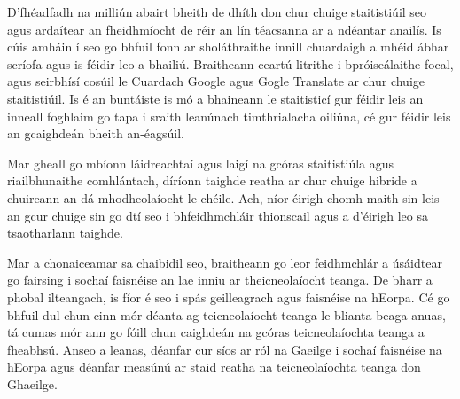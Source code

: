 \documentclass[]{../../metanetpaper}
\begin{document}
\begin{multicols}{2}
D’fhéadfadh na milliún abairt bheith de dhíth don chur chuige staitistiúil seo agus ardaítear an fheidhmíocht de réir an lín téacsanna ar a ndéantar anailís. Is cúis amháin í seo go bhfuil fonn ar sholáthraithe innill chuardaigh a mhéid ábhar scríofa agus is féidir leo a bhailiú. Braitheann ceartú litrithe i bpróiseálaithe focal, agus seirbhísí cosúil le Cuardach Google agus Gogle Translate ar chur chuige staitistiúil. Is é an buntáiste is mó a bhaineann le staitisticí gur féidir leis an inneall foghlaim go tapa i sraith leanúnach timthrialacha oiliúna, cé gur féidir leis an gcaighdeán bheith an-éagsúil. 

Mar gheall go mbíonn láidreachtaí agus laigí na gcóras staitistiúla agus riailbhunaithe comhlántach, díríonn taighde reatha ar chur chuige hibride a chuireann an dá mhodheolaíocht le chéile. Ach, níor éirigh chomh maith sin leis an gcur chuige sin go dtí seo i bhfeidhmchláir thionscail agus a d’éirigh leo sa tsaotharlann taighde. 

Mar a chonaiceamar sa chaibidil seo, braitheann go leor feidhmchlár a úsáidtear go fairsing i sochaí faisnéise an lae inniu ar theicneolaíocht teanga. De bharr a phobal ilteangach, is fíor é seo i spás geilleagrach agus faisnéise na hEorpa. Cé go bhfuil dul chun cinn mór déanta ag teicneolaíocht teanga le blianta beaga anuas, tá cumas mór ann go fóill chun caighdeán na gcóras teicneolaíochta teanga a fheabhsú. Anseo a leanas, déanfar cur síos ar ról na Gaeilge i sochaí faisnéise na hEorpa agus déanfar measúnú ar staid reatha na teicneolaíochta teanga don Ghaeilge.
\end{multicols}

\clearpage


\end{document}
